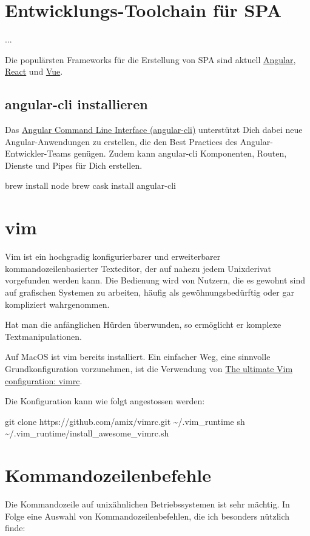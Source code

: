 \documentclass[]{article}
\begin{document}
\section{Entwicklungs-Toolchain für SPA}
...

Die populärsten Frameworks für die Erstellung von SPA sind aktuell \href{https://angular.io/}{Angular}, \href{https://reactjs.org/}{React} und \href{https://vuejs.org/}{Vue}.

\subsection{angular-cli installieren}
Das \href{https://cli.angular.io/}{Angular Command Line Interface (angular-cli)} unterstützt Dich dabei neue Angular-Anwendungen zu erstellen, die den Best Practices des Angular-Entwickler-Teams genügen. Zudem kann angular-cli Komponenten, Routen, Dienste und Pipes für Dich erstellen.

\begin{bashcode}
brew install node
brew cask install angular-cli
\end{bashcode}

\section{vim}
Vim ist ein hochgradig konfigurierbarer und erweiterbarer kommandozeilenbasierter Texteditor, der auf nahezu jedem Unixderivat vorgefunden werden kann. Die Bedienung wird von Nutzern, die es gewohnt sind auf grafischen Systemen zu arbeiten, häufig als gewöhnungsbedürftig oder gar kompliziert wahrgenommen. 

Hat man die anfänglichen Hürden überwunden, so  ermöglicht er komplexe Textmanipulationen.

Auf MacOS ist vim bereits installiert. Ein einfacher Weg, eine sinnvolle Grundkonfiguration vorzunehmen, ist die Verwendung von \href{https://github.com/amix/vimrc}{The ultimate Vim configuration: vimrc}.

Die Konfiguration kann wie folgt angestossen werden:

\begin{bashcode}
git clone https://github.com/amix/vimrc.git \~{}/.vim\_runtime
sh \~{}/.vim\_runtime/install\_awesome\_vimrc.sh
\end{bashcode}

\section{Kommandozeilenbefehle}
Die Kommandozeile auf unixähnlichen Betriebssystemen ist sehr mächtig. 
In Folge eine Auswahl von Kommandozeilenbefehlen, die ich besonders nützlich finde:
\end{document}
